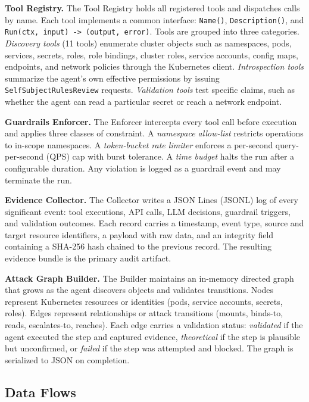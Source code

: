 \documentclass[conference]{IEEEtran}
\begin{document}
\textbf{Tool Registry.}
The Tool Registry holds all registered tools and dispatches calls by name. Each tool implements a common interface: \texttt{Name()}, \texttt{Description()}, and \texttt{Run(ctx, input) -> (output, error)}. Tools are grouped into three categories. \emph{Discovery tools} (11 tools) enumerate cluster objects such as namespaces, pods, services, secrets, roles, role bindings, cluster roles, service accounts, config maps, endpoints, and network policies through the Kubernetes client. \emph{Introspection tools} summarize the agent's own effective permissions by issuing \texttt{SelfSubjectRulesReview} requests. \emph{Validation tools} test specific claims, such as whether the agent can read a particular secret or reach a network endpoint.

\textbf{Guardrails Enforcer.}
The Enforcer intercepts every tool call before execution and applies three classes of constraint. A \emph{namespace allow-list} restricts operations to in-scope namespaces. A \emph{token-bucket rate limiter} enforces a per-second query-per-second (QPS) cap with burst tolerance. A \emph{time budget} halts the run after a configurable duration. Any violation is logged as a guardrail event and may terminate the run.

\textbf{Evidence Collector.}
The Collector writes a JSON Lines (JSONL) log of every significant event: tool executions, API calls, LLM decisions, guardrail triggers, and validation outcomes. Each record carries a timestamp, event type, source and target resource identifiers, a payload with raw data, and an integrity field containing a SHA-256 hash chained to the previous record. The resulting evidence bundle is the primary audit artifact.

\textbf{Attack Graph Builder.}
The Builder maintains an in-memory directed graph that grows as the agent discovers objects and validates transitions. Nodes represent Kubernetes resources or identities (pods, service accounts, secrets, roles). Edges represent relationships or attack transitions (mounts, binds-to, reads, escalates-to, reaches). Each edge carries a validation status: \emph{validated} if the agent executed the step and captured evidence, \emph{theoretical} if the step is plausible but unconfirmed, or \emph{failed} if the step was attempted and blocked. The graph is serialized to JSON on completion.

\subsection{Data Flows}
\end{document}
